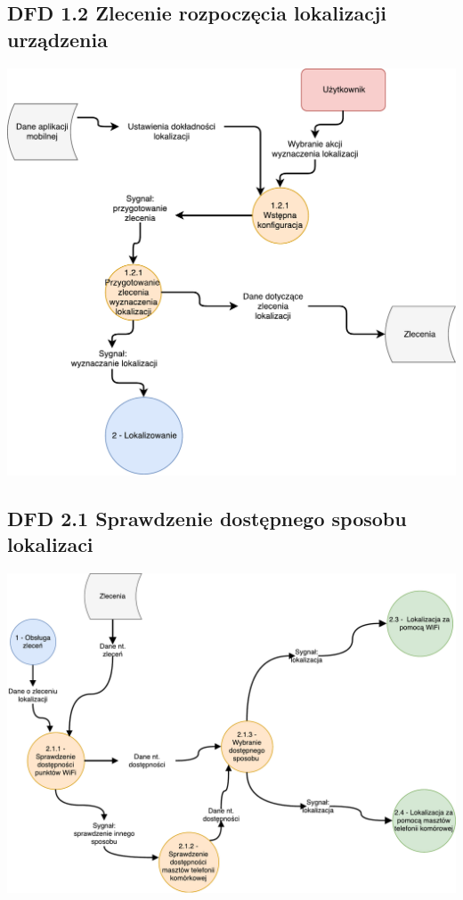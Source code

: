 \documentclass[11pt]{article}
\begin{document}
	\subsection{DFD 1.2 Zlecenie rozpoczęcia lokalizacji urządzenia}
	\begin{center}
		\includegraphics[scale=0.7]{DFD12.pdf}
	\end{center}
	\newpage
	\subsection{DFD 2.1 Sprawdzenie dostępnego sposobu lokalizaci}
	\begin{center}
		\includegraphics[scale=0.6]{DFD21.pdf}
	\end{center}
\end{document}
